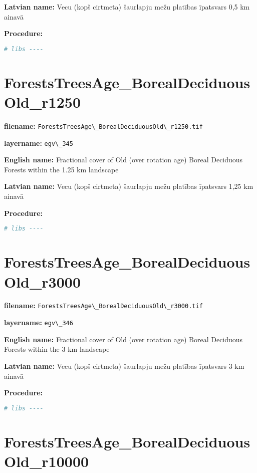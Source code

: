 \documentclass[
]{book}
\newcommand{\passthrough}[1]{#1}
\begin{document}
\textbf{Latvian name:} Vecu (kopš cirtmeta) šaurlapju mežu platības īpatsvars 0,5 km ainavā

\textbf{Procedure:}

\begin{lstlisting}[language=R]
# libs ----
\end{lstlisting}

\section{ForestsTreesAge\_BorealDeciduousOld\_r1250}\label{ch06.345}

\textbf{filename:} \passthrough{\lstinline!ForestsTreesAge\_BorealDeciduousOld\_r1250.tif!}

\textbf{layername:} \passthrough{\lstinline!egv\_345!}

\textbf{English name:} Fractional cover of Old (over rotation age) Boreal Deciduous Forests within the 1.25 km landscape

\textbf{Latvian name:} Vecu (kopš cirtmeta) šaurlapju mežu platības īpatsvars 1,25 km ainavā

\textbf{Procedure:}

\begin{lstlisting}[language=R]
# libs ----
\end{lstlisting}

\section{ForestsTreesAge\_BorealDeciduousOld\_r3000}\label{ch06.346}

\textbf{filename:} \passthrough{\lstinline!ForestsTreesAge\_BorealDeciduousOld\_r3000.tif!}

\textbf{layername:} \passthrough{\lstinline!egv\_346!}

\textbf{English name:} Fractional cover of Old (over rotation age) Boreal Deciduous Forests within the 3 km landscape

\textbf{Latvian name:} Vecu (kopš cirtmeta) šaurlapju mežu platības īpatsvars 3 km ainavā

\textbf{Procedure:}

\begin{lstlisting}[language=R]
# libs ----
\end{lstlisting}

\section{ForestsTreesAge\_BorealDeciduousOld\_r10000}\label{ch06.347}
\end{document}
